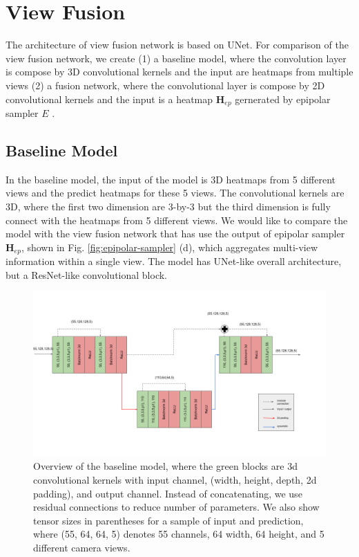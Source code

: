 \section{View Fusion}
The architecture of view fusion network is based on UNet. For comparison of the view fusion network, we create (1) a baseline model, where the convolution layer is compose by 3D convolutional kernels and the input are heatmaps from multiple views (2) a fusion network, where the convolutional layer is compose by 2D convolutional kernels and the input is a heatmap $\mathbf{H}_{ep}$ gernerated by epipolar sampler $\mathit{E}$ . 
\subsection{Baseline Model}
In the baseline model, the input of the model is 3D heatmaps from 5 different views and the predict heatmaps for these 5 views. The convolutional kernels are 3D, where the first two dimension are 3-by-3 but the third dimension is fully connect with the heatmaps from 5 different views. We would like to compare the model with the view fusion network that has use the output of epipolar sampler $\mathbf{H}_{ep}$, shown in Fig. \ref{fig:epipolar-sampler} (d), which aggregates multi-view information within a single view. The model has UNet-like overall architecture, but a ResNet-like convolutional block.
\begin{figure}
	\centering
	\includegraphics[width=1.0\columnwidth]{figures/ch4/baseline.png}
	\caption{Overview of the baseline model, where the green blocks are 3d convolutional kernels with input channel, (width, height, depth, 2d padding), and output channel. Instead of concatenating, we use residual connections to reduce number of parameters. We also show tensor sizes in parentheses for a sample of input and prediction, where (55, 64, 64, 5) denotes 55 channels, 64 width, 64 height, and 5 different camera views.}
	\label{fig:view-baseline}
\end{figure}
